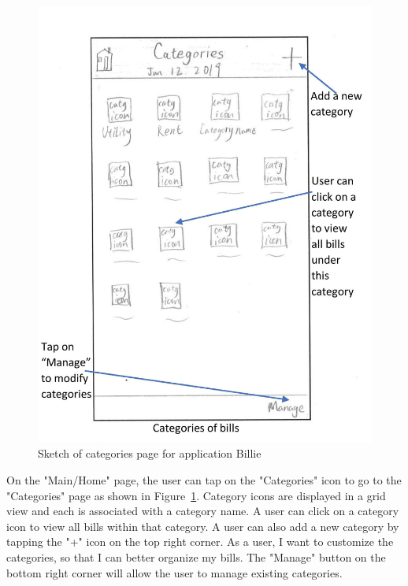 \documentclass{sigchi}
\begin{document}
\begin{figure}[h!]
\centering
  \includegraphics[width=0.6\columnwidth]{16-category-page.jpg}
  \caption{Sketch of categories page for application Billie}
  \label{fig:figure31}
\end{figure}
On the "Main/Home" page, the user can tap on the "Categories" icon to go to the "Categories" page as shown in Figure~\ref{fig:figure31}. Category icons are displayed in a grid view and each is associated with a category name. A user can click on a category icon to view all bills within that category. A user can also add a new category by tapping the "+" icon on the top right corner.  As a user, I want to customize the categories, so that I can better organize my bills. The "Manage" button on the bottom right corner will allow the user to manage existing categories.
\end{document}

